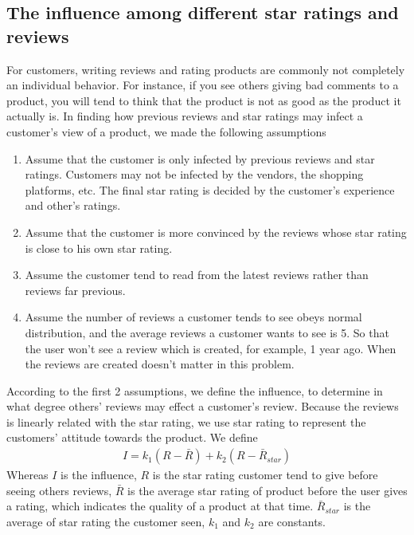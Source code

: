 \documentclass[12pt]{article}  %
\begin{document}
\subsection{The influence among different star ratings and reviews}
\label{sec:The influence among different star ratings and reviews}

For customers, writing reviews and rating products are commonly not completely an individual behavior. For instance, if you see others giving bad comments to a product, you will tend to think that the product is not as good as the product it actually is. In finding how previous reviews and star ratings may infect a customer's view of a product, we made the following assumptions

\begin{enumerate}[\bfseries 1.]
\item Assume that the customer is only infected by previous reviews and star ratings. Customers may not be infected by the vendors, the shopping platforms, etc. The final star rating is decided by the customer's experience and other's ratings.
\item Assume that the customer is more convinced by the reviews whose star rating is close to his own star rating.
\item Assume the customer tend to read from the latest reviews rather than reviews far previous.
\item Assume the number of reviews a customer tends to see obeys normal distribution, and the average reviews a customer wants to see is 5. So that the user won't see a review which is created, for example, 1 year ago. When the reviews are created doesn't matter in this problem.
\end{enumerate}

According to the first 2 assumptions, we define the influence, to determine in what degree others' reviews may effect a customer's review. Because the reviews is linearly related with the star rating, we use star rating to represent the customers' attitude towards the product. We define
\begin{equation*}
  \begin{aligned}
    I = k_1 (R - \bar{R}) + k_2 (R - \bar{R}_{star})
  \end{aligned}
\end{equation*}
Whereas $I$ is the influence, $R$ is the star rating customer tend to give before seeing others reviews, $\bar{R}$ is the average star rating of product before the user gives a rating, which indicates the quality of a product at that time. $\bar{R}_{star}$ is the average of star rating the customer seen, $k_1$ and $k_2$ are constants.
\end{document}
